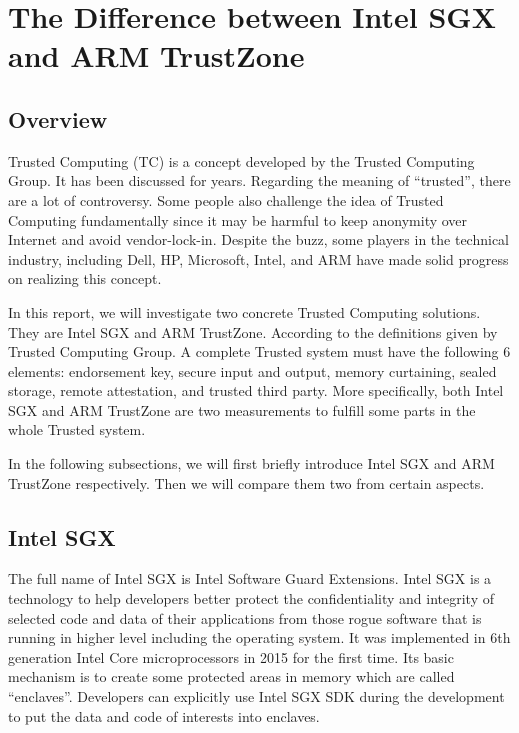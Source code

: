 \section{The Difference between Intel SGX and ARM TrustZone}\label{sec:difference}







\subsection{Overview}
Trusted Computing (TC) is a concept developed by the Trusted Computing Group.
It has been discussed for years. Regarding the meaning of ``trusted'', there
are a lot of controversy. Some people also challenge the idea of Trusted
Computing fundamentally since it may be harmful to keep anonymity over 
Internet and avoid vendor-lock-in. Despite the buzz, some players in 
the technical industry, including Dell, HP, Microsoft, Intel, and ARM 
have made solid progress on realizing this concept.

In this report, we will investigate two concrete Trusted Computing solutions.
They are Intel SGX and ARM TrustZone. 
According to the definitions given by Trusted Computing Group. A complete 
Trusted system must have the following 6 elements: endorsement key, 
secure input and output, memory curtaining, sealed storage, remote 
attestation, and trusted third party. More specifically, both Intel
SGX and ARM TrustZone are two measurements to fulfill some parts
in the whole Trusted system.  
 
In the following subsections, we will first briefly introduce 
Intel SGX and ARM TrustZone respectively. Then we will compare 
them two from certain aspects.


\subsection{Intel SGX}
The full name of Intel SGX is Intel Software Guard Extensions. Intel
SGX is a technology to help developers better protect the 
confidentiality and integrity of selected code and data of their 
applications from those rogue software that is running in higher
level including the operating system. It was implemented in 6th
generation Intel Core microprocessors in 2015 for the first time.
Its basic mechanism is to create some protected areas in memory 
which are called ``enclaves''. Developers can explicitly use Intel
SGX SDK during the development to put the data and code of interests 
into enclaves.   


